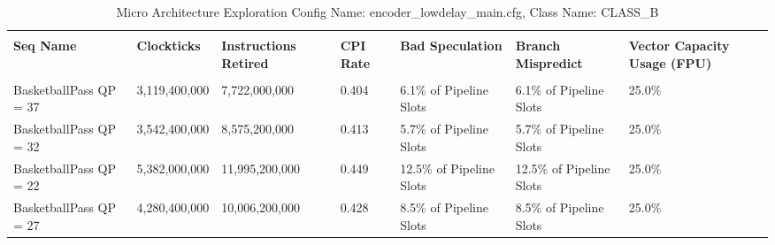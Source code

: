 \documentclass{article}%
\begin{document}
\newpage%
\begin{longtabu}{| X[l] | X[l] | X[l] | X[l] | X[l] | X[l] | X[l] |}%
\caption{%
Micro Architecture Exploration\newline%
 Config Name: encoder\_lowdelay\_main.cfg,\newline%
 Class Name: CLASS\_B\newline%
%
}%
\hline%
&&&&&&\\%
\textbf{Seq Name}&\textbf{Clockticks}&\textbf{Instructions Retired}&\textbf{CPI Rate}&\textbf{Bad Speculation}&\textbf{Branch Mispredict}&\textbf{Vector Capacity Usage (FPU)}\\%
&&&&&&\\%
\hline%
\endhead%
BasketballPass\newline%
 QP = 37&3,119,400,000&7,722,000,000&0.404&6.1\% of Pipeline Slots&6.1\% of Pipeline Slots&25.0\%\\%
\hline%
BasketballPass\newline%
 QP = 32&3,542,400,000&8,575,200,000&0.413&5.7\% of Pipeline Slots&5.7\% of Pipeline Slots&25.0\%\\%
\hline%
BasketballPass\newline%
 QP = 22&5,382,000,000&11,995,200,000&0.449&12.5\% of Pipeline Slots&12.5\% of Pipeline Slots&25.0\%\\%
\hline%
BasketballPass\newline%
 QP = 27&4,280,400,000&10,006,200,000&0.428&8.5\% of Pipeline Slots&8.5\% of Pipeline Slots&25.0\%\\%
\hline%
\end{longtabu}%
\end{document}
